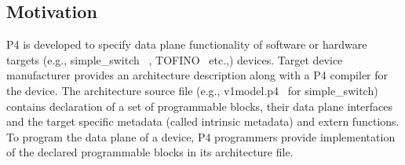 \documentclass[10pt,sigconf,letterpaper,anonymous]{acmart}
\begin{document}
\subsection{Motivation}
P4 is developed to specify data plane functionality of software or hardware targets (e.g., simple\_switch ~\cite{simple_switch.md}, TOFINO~\cite{tofino} etc.,) devices.
Target device manufacturer provides an architecture description along with a P4 compiler for the device.
The architecture source file (e.g., v1model.p4~\cite{v1model.p4} for simple\_switch) contains declaration of a set of pro\-gram\-ma\-ble blocks, their data plane interfaces and the target specific metadata (called intrinsic metadata) and extern functions.
To program the data plane of a device, P4 programmers provide implementation of the declared programmable blocks in its architecture file.
\end{document}
